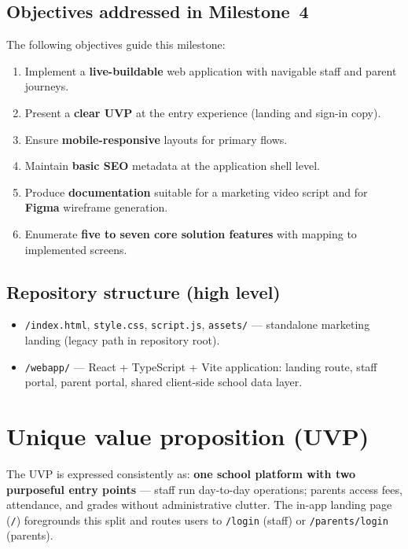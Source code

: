 \documentclass[11pt,a4paper]{article}
\begin{document}
\subsection{Objectives addressed in Milestone~4}
The following objectives guide this milestone:
\begin{enumerate}[leftmargin=*]
  \item Implement a \textbf{live-buildable} web application with navigable staff and parent journeys.
  \item Present a \textbf{clear UVP} at the entry experience (landing and sign-in copy).
  \item Ensure \textbf{mobile-responsive} layouts for primary flows.
  \item Maintain \textbf{basic SEO} metadata at the application shell level.
  \item Produce \textbf{documentation} suitable for a marketing video script and for \textbf{Figma} wireframe generation.
  \item Enumerate \textbf{five to seven core solution features} with mapping to implemented screens.
\end{enumerate}

\subsection{Repository structure (high level)}
\begin{itemize}[leftmargin=*]
  \item \texttt{/index.html}, \texttt{style.css}, \texttt{script.js}, \texttt{assets/} --- standalone marketing landing (legacy path in repository root).
  \item \texttt{/webapp/} --- React + TypeScript + Vite application: landing route, staff portal, parent portal, shared client-side school data layer.
\end{itemize}

\section{Unique value proposition (UVP)}

The UVP is expressed consistently as: \textbf{one school platform with two purposeful entry points} --- staff run day-to-day operations; parents access fees, attendance, and grades without administrative clutter. The in-app landing page (\texttt{/}) foregrounds this split and routes users to \texttt{/login} (staff) or \texttt{/parents/login} (parents).
\end{document}
